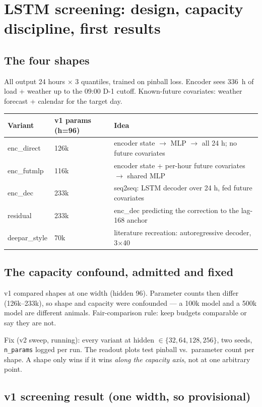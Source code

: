 \section{LSTM screening: design, capacity discipline, first results}

\subsection{The four shapes}

All output 24 hours $\times$ 3 quantiles, trained on pinball loss.
Encoder sees 336~h of load + weather up to the 09:00 D-1 cutoff.
Known-future covariates: weather forecast + calendar for the target day.

\begin{center}
\begin{tabular}{llp{6cm}}
\toprule
Variant & v1 params (h=96) & Idea \\
\midrule
enc\_direct & 126k & encoder state $\to$ MLP $\to$ all 24 h; no future covariates \\
enc\_futmlp & 116k & encoder state + per-hour future covariates $\to$ shared MLP \\
enc\_dec    & 233k & seq2seq: LSTM decoder over 24 h, fed future covariates \\
residual    & 233k & enc\_dec predicting the correction to the lag-168 anchor \\
deepar\_style & 70k & literature recreation: autoregressive decoder, 3$\times$40 \\
\bottomrule
\end{tabular}
\end{center}

\subsection{The capacity confound, admitted and fixed}

v1 compared shapes at one width (hidden 96). Parameter counts then differ
(126k--233k), so shape and capacity were confounded --- a 100k model and a
500k model are different animals. Fair-comparison rule: keep budgets
comparable or say they are not.

Fix (v2 sweep, running): every variant at hidden $\in \{32, 64, 128, 256\}$,
two seeds, \texttt{n\_params} logged per run. The readout plots test pinball
vs.\ parameter count per shape. A shape only wins if it wins \emph{along the
capacity axis}, not at one arbitrary point.

\subsection{v1 screening result (one width, so provisional)}

